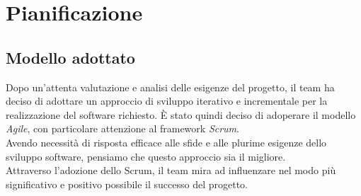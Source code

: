 
\section{Pianificazione}
\subsection{Modello adottato}
Dopo un'attenta valutazione e analisi delle esigenze del progetto, il team ha deciso di adottare un approccio di sviluppo iterativo e incrementale per la realizzazione del software richiesto. È stato quindi deciso di adoperare il modello \textit{Agile}, con particolare attenzione al framework \textit{Scrum}.\\
Avendo necessità di risposta efficace alle sfide e alle plurime esigenze dello sviluppo software, pensiamo che questo approccio sia il migliore.\\
Attraverso l'adozione dello Scrum, il team mira ad influenzare nel modo più significativo e positivo possibile il successo del progetto.
